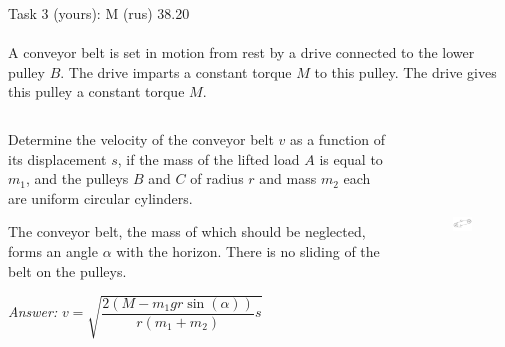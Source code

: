 \documentclass[aspectratio=169]{beamer}
\begin{document}
\begin{frame}[t]{Task 3 (yours): M (rus) 38.20}
\framesubtitle{}
\small
A conveyor belt is set in motion from rest by a drive connected to the lower pulley $B$. The drive imparts a constant torque $M$ to this pulley. The drive gives this pulley a constant torque $M$. 
\begin{columns}[T,onlytextwidth]
    \begin{column}{0.59\textwidth}
Determine the velocity of the conveyor belt $v$ as a function of its displacement $s$, if the mass of the lifted load $A$ is equal to $m_1$, and the pulleys $B$ and $C$ of radius $r$ and mass $m_2$ each are uniform circular cylinders. 
\medskip

The conveyor belt, the mass of which should be neglected, forms an angle $\alpha$ with the horizon. There is no sliding of the belt on the pulleys.
\medskip

\textit{Answer:} $v = \sqrt{\dfrac{2(M-m_1 g r \sin(\alpha))}{r(m_1 + m_2)}s}$

    \end{column}
    \begin{column}{0.39\textwidth}
        \begin{figure}[H]
            \centering\includegraphics[height=5cm,width=1\textwidth,keepaspectratio]{image2.png}
            \label{fig:image2.png}
        \end{figure}
    \end{column}
\end{columns}
\end{frame}
\end{document}
